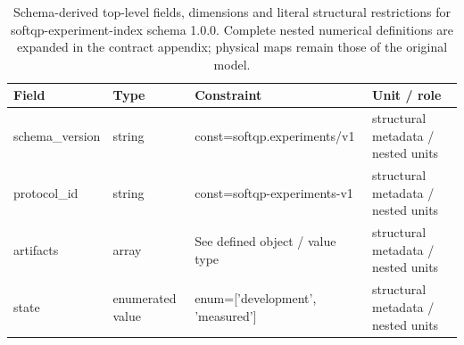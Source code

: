 \begin{table}[htbp]\centering\footnotesize
\caption{Schema-derived top-level fields, dimensions and literal structural restrictions for softqp-experiment-index schema 1.0.0. Complete nested numerical definitions are expanded in the contract appendix; physical maps remain those of the original model.}\label{tab:contract-softqp-experiment-index}
\begin{tabularx}{\textwidth}{@{}>{\raggedright\arraybackslash}p{}>{\raggedright\arraybackslash}p{}>{\raggedright\arraybackslash}X>{\raggedright\arraybackslash}X@{}}\toprule
Field & Type & Constraint & Unit / role\\\midrule
schema\_\allowbreak{}version & string & const=\allowbreak{}softqp.\allowbreak{}experiments/\allowbreak{}v1 & structural metadata /\allowbreak{} nested units\\
protocol\_\allowbreak{}id & string & const=\allowbreak{}softqp-\allowbreak{}experiments-\allowbreak{}v1 & structural metadata /\allowbreak{} nested units\\
artifacts & array & See defined object /\allowbreak{} value type & structural metadata /\allowbreak{} nested units\\
state & enumerated value & enum=\allowbreak{}['development', 'measured'] & structural metadata /\allowbreak{} nested units\\
\bottomrule\end{tabularx}
\end{table}
